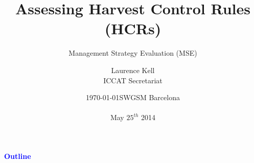 \documentclass{beamer}
\date{\textcolor{light-gray}{\today}}
\begin{document}

\title{Assessing Harvest Control Rules (HCRs)}

\subtitle{Management Strategy Evaluation (MSE)}

\date{SWGSM Barcelona \\ ~ \\ May $25^{th}$ 2014}

        
\author{\parbox[t]{4.0cm}{\center Laurence Kell \\ ICCAT Secretariat}}
    

\begin{frame} \titlepage \end{frame}


\begin{frame}\textcolor{blue}{\large{\textbf{Outline}}} \tableofcontents \end{frame}
\end{document}
